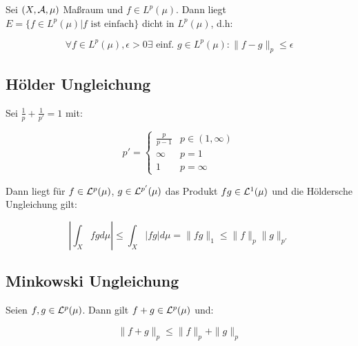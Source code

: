 Sei $(X,\mathcal{A},\mu)$ Maßraum und $f \in L^p(\mu)$. Dann liegt $E = \{ f \in L^p(\mu) | f \text{ ist einfach} \}$ dicht in $L^p(\mu)$, d.h:

\vspace{-4mm}
$$\forall f \in L^p(\mu), \epsilon > 0 \exists \text{ einf. } g \in L^p(\mu) : \| f - g \|_p \leq \epsilon$$

\subsection*{Hölder Ungleichung}

Sei $\frac{1}{p} + \frac{1}{p'} = 1$ mit:

\vspace{-4mm}
$$p' = \begin{cases}
	\frac{p}{p-1} & p \in (1, \infty) \\
	\infty        & p = 1 \\
	1        & p = \infty
\end{cases}$$

Dann liegt für $f \in \mathcal{L}^p(\mu)$, $g \in \mathcal{L}^{p'}(\mu)$ das Produkt $fg \in \mathcal{L}^1(\mu)$ und die Höldersche Ungleichung gilt:

\vspace{-4mm}
$$\left| \int_X fg d\mu \right| \leq \int_X |fg| d\mu = \|fg\|_1 \leq \|f\|_p \|g\|_{p'}$$

\subsection*{Minkowski Ungleichung}

Seien $f, g \in \mathcal{L}^p(\mu)$. Dann gilt $f + g \in \mathcal{L}^p(\mu)$ und:

\vspace{-2mm}
$$\| f + g \|_p \leq \|f\|_p + \|g\|_p$$
